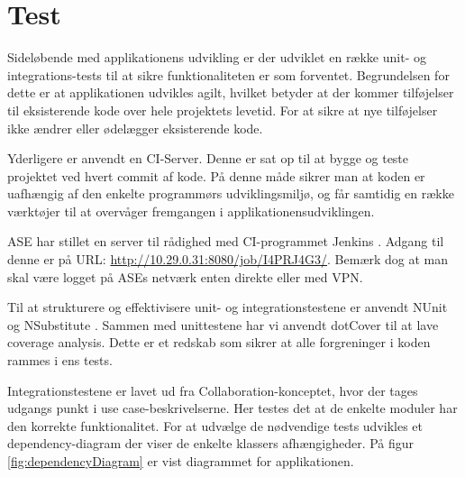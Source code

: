 \chapter{Test}
Sideløbende med applikationens udvikling er der udviklet en række unit- og integrations-tests til at sikre funktionaliteten er som forventet. Begrundelsen for dette er at applikationen udvikles agilt, hvilket betyder at der kommer tilføjelser til eksisterende kode over hele projektets levetid. For at sikre at nye tilføjelser ikke ændrer eller ødelægger eksisterende kode.

Yderligere er anvendt en CI-Server. Denne er sat op til at bygge og teste projektet ved hvert commit af kode. På denne måde sikrer man at koden er uafhængig af den enkelte programmørs udviklingsmiljø, og får samtidig en række værktøjer til at overvåger fremgangen i applikationensudviklingen.

ASE har stillet en server til rådighed med CI-programmet Jenkins \citep{jenkinsWeb}. Adgang til denne er på URL: \url{http://10.29.0.31:8080/job/I4PRJ4G3/}. Bemærk dog at man skal være logget på ASEs netværk enten direkte eller med VPN.

Til at strukturere og effektivisere unit- og integrationstestene er anvendt NUnit \citep{nunitWeb} og NSubstitute \citep{nsubstituteWeb}. Sammen med unittestene har vi anvendt dotCover \citep{dotCoverWeb} til at lave coverage analysis. Dette er et redskab som sikrer at alle forgreninger i koden rammes i ens tests.

Integrationstestene er lavet ud fra Collaboration-konceptet, hvor der tages udgangs punkt i use case-beskrivelserne. Her testes det at de enkelte moduler har den korrekte funktionalitet.
For at udvælge de nødvendige tests udvikles et dependency-diagram der viser de enkelte klassers afhængigheder. På figur \ref{fig:dependencyDiagram} er vist diagrammet for applikationen.
